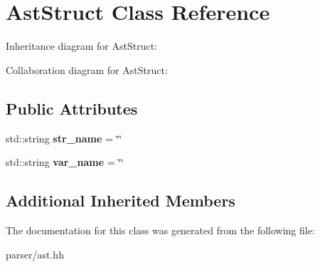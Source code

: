 \hypertarget{classAstStruct}{}\section{Ast\+Struct Class Reference}
\label{classAstStruct}


Inheritance diagram for Ast\+Struct\+:


Collaboration diagram for Ast\+Struct\+:
\subsection*{Public Attributes}
\begin{DoxyCompactItemize}
\item 
\mbox{\label{classAstStruct_a66d7ba49afb7a19df6bc438b41eb330d}} 
std\+::string {\bfseries str\+\_\+name} = \char`\"{}\char`\"{}
\item 
\mbox{\label{classAstStruct_a4d827e0760507ebb78508bafe6d1074c}} 
std\+::string {\bfseries var\+\_\+name} = \char`\"{}\char`\"{}
\end{DoxyCompactItemize}
\subsection*{Additional Inherited Members}


The documentation for this class was generated from the following file\+:\begin{DoxyCompactItemize}
\item 
parser/ast.\+hh\end{DoxyCompactItemize}
